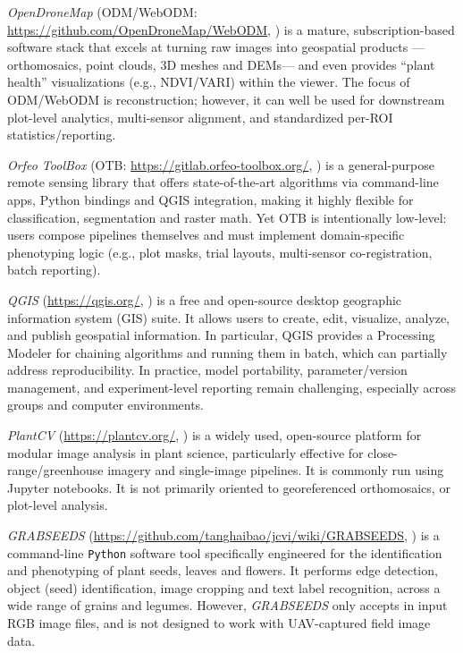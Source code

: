 \documentclass[drones,technicalnote,accept,pdftex,moreauthors]{Definitions/mdpi}
\begin{document}
\textit{OpenDroneMap} (ODM/WebODM: \url{https://github.com/OpenDroneMap/WebODM}, \cite{vacca2020web}) is a mature, subscription-based software stack that excels at turning raw images into geospatial products —orthomosaics, point clouds, 3D meshes and DEMs— and even provides “plant health” visualizations (e.g., NDVI/VARI) within the viewer. The focus of ODM/WebODM is reconstruction; however, it can well be used for downstream plot-level analytics, multi-sensor alignment, and standardized per-ROI statistics/reporting.

\textit{Orfeo ToolBox} (OTB: \url{https://gitlab.orfeo-toolbox.org/}, \cite{noauthor_orfeo_nodate, grizonnet_orfeo_2017}) is a general-purpose remote sensing library that offers state-of-the-art algorithms via command-line apps, Python bindings and QGIS integration, making it highly flexible for classification, segmentation and raster math. Yet OTB is intentionally low-level: users compose pipelines themselves and must implement domain-specific phenotyping logic (e.g., plot masks, trial layouts, multi-sensor co-registration, batch reporting). 

\textit{QGIS} (\url{https://qgis.org/}, \cite{moyroud2018introduction}) is a free and open-source desktop geographic information system (GIS) suite. It allows users to create, edit, visualize, analyze, and publish geospatial information. In particular, QGIS provides a Processing Modeler \cite{dobesova2020evaluation} for chaining algorithms and running them in batch, which can partially address reproducibility. In practice, model portability, parameter/version management, and experiment-level reporting remain challenging, especially across groups and computer environments.

\textit{PlantCV} (\url{https://plantcv.org/}, \cite{noauthor_plantcv_2021}) is a widely used, open-source platform for modular image analysis in plant science, particularly effective for close-range/greenhouse imagery and single-image pipelines. It is commonly run using Jupyter notebooks. It is not primarily oriented to georeferenced orthomosaics,  or plot-level analysis.

\textit{GRABSEEDS} (\url{https://github.com/tanghaibao/jcvi/wiki/GRABSEEDS}, \cite{tang2024grabseeds}) is a command-line \texttt{Python} software tool specifically engineered for the identification and phenotyping of plant seeds, leaves and flowers.
It performs edge detection, object (seed) identification, image cropping and text label recognition, across a wide range of grains and legumes.
However, \textit{GRABSEEDS} only accepts in input RGB image files, and is not designed to work with UAV-captured field image data.
\end{document}
